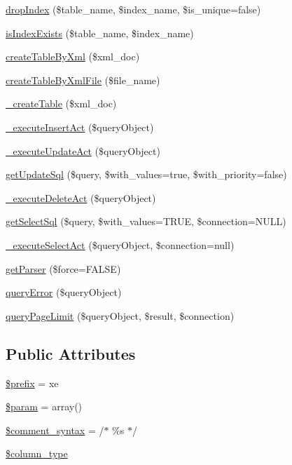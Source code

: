 \begin{DoxyCompactItemize}
\item 
\hyperlink{classDBMssql_a83bea7f71705370699eac384c5f93088}{drop\+Index} (\$table\+\_\+name, \$index\+\_\+name, \$is\+\_\+unique=false)
\item 
\hyperlink{classDBMssql_a17723942b3686527a68b72a1740136c3}{is\+Index\+Exists} (\$table\+\_\+name, \$index\+\_\+name)
\item 
\hyperlink{classDBMssql_a7a3ff51c1a29e47c02f358dc6064d88b}{create\+Table\+By\+Xml} (\$xml\+\_\+doc)
\item 
\hyperlink{classDBMssql_ae136845dee2ecc1bd8fe3a7c535572f4}{create\+Table\+By\+Xml\+File} (\$file\+\_\+name)
\item 
\hyperlink{classDBMssql_a0705365081b34014652f440380c53519}{\+\_\+create\+Table} (\$xml\+\_\+doc)
\item 
\hyperlink{classDBMssql_aa3f04ce5bee8d9e11db7de7293055fef}{\+\_\+execute\+Insert\+Act} (\$query\+Object)
\item 
\hyperlink{classDBMssql_a855a8b1b61f7840ce057f72fa5a39300}{\+\_\+execute\+Update\+Act} (\$query\+Object)
\item 
\hyperlink{classDBMssql_a10dad79ab29a55301ef2327fb27f86aa}{get\+Update\+Sql} (\$query, \$with\+\_\+values=true, \$with\+\_\+priority=false)
\item 
\hyperlink{classDBMssql_a871bd07e7224b27daba828686ee57a8a}{\+\_\+execute\+Delete\+Act} (\$query\+Object)
\item 
\hyperlink{classDBMssql_a37ed6e799c12ecafdea33d6fb0a84f87}{get\+Select\+Sql} (\$query, \$with\+\_\+values=T\+R\+U\+E, \$connection=N\+U\+L\+L)
\item 
\hyperlink{classDBMssql_a819a9181e9f34ce00f6f2d8a273813a6}{\+\_\+execute\+Select\+Act} (\$query\+Object, \$connection=null)
\item 
\hyperlink{classDBMssql_aa67e4dcd0df911a7c4e6325f21f0fb04}{get\+Parser} (\$force=F\+A\+L\+S\+E)
\item 
\hyperlink{classDBMssql_adeea6fd6090140a4b81051c5ff68cdfe}{query\+Error} (\$query\+Object)
\item 
\hyperlink{classDBMssql_a5a63ce969c396b656ac50e2251e798b9}{query\+Page\+Limit} (\$query\+Object, \$result, \$connection)
\end{DoxyCompactItemize}
\subsection*{Public Attributes}
\begin{DoxyCompactItemize}
\item 
\hyperlink{classDBMssql_a733cd192b424b5a66ea14e3e62391844}{\$prefix} = \textquotesingle{}xe\textquotesingle{}
\item 
\hyperlink{classDBMssql_a352ee40852cea6dc20de096486603805}{\$param} = array()
\item 
\hyperlink{classDBMssql_ad095d953d508f44a326586a10c95336d}{\$comment\+\_\+syntax} = \textquotesingle{}/$\ast$ \%s $\ast$/\textquotesingle{}
\item 
\hyperlink{classDBMssql_a785e589df00c87bb0003b573aa5d7fee}{\$column\+\_\+type}
\end{DoxyCompactItemize}
